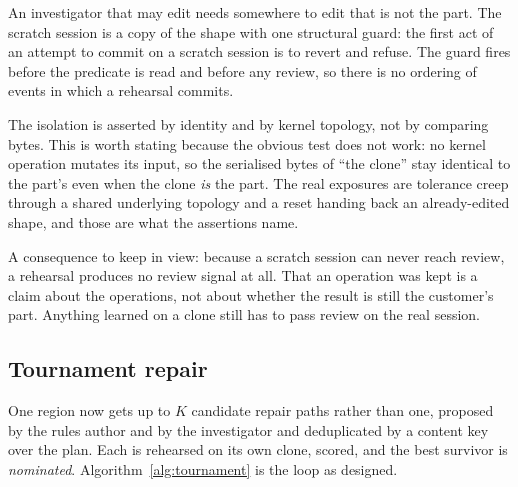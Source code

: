 \documentclass[10pt,onecolumn]{article}
\begin{document}
An investigator that may edit needs somewhere to edit that is not the part. The scratch session is
a copy of the shape with one structural guard: the first act of an attempt to commit on a scratch
session is to revert and refuse. The guard fires before the predicate is read and before any
review, so there is no ordering of events in which a rehearsal commits.

The isolation is asserted by identity and by kernel topology, not by comparing bytes. This is worth
stating because the obvious test does not work: no kernel operation mutates its input, so the
serialised bytes of ``the clone'' stay identical to the part's even when the clone \emph{is} the
part. The real exposures are tolerance creep through a shared underlying topology and a reset
handing back an already-edited shape, and those are what the assertions name.

A consequence to keep in view: because a scratch session can never reach review, a rehearsal
produces no review signal at all. That an operation was kept is a claim about the operations, not
about whether the result is still the customer's part. Anything learned on a clone still has to
pass review on the real session.

\subsection{Tournament repair}\label{sec:tournament}

One region now gets up to $K$ candidate repair paths rather than one, proposed by the rules author
and by the investigator and deduplicated by a content key over the plan. Each is rehearsed on its
own clone, scored, and the best survivor is \emph{nominated}. Algorithm~\ref{alg:tournament} is the
loop as designed.
\end{document}
